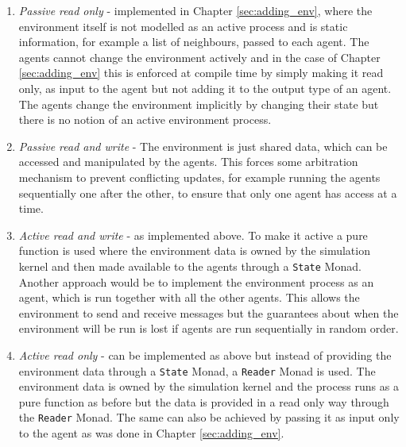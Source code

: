 \begin{enumerate}
	\item \textit{Passive read only} - implemented in Chapter \ref{sec:adding_env}, where the environment itself is not modelled as an active process and is static information, for example a list of neighbours, passed to each agent. The agents cannot change the environment actively and in the case of Chapter \ref{sec:adding_env} this is enforced at compile time by simply making it read only, as input to the agent but not adding it to the output type of an agent. The agents change the environment implicitly by changing their state but there is no notion of an active environment process.
	
	\item \textit{Passive read and write} - The environment is just shared data, which can be accessed and manipulated by the agents. This forces some arbitration mechanism to prevent conflicting updates, for example running the agents sequentially one after the other, to ensure that only one agent has access at a time.
	
	\item \textit{Active read and write} - as implemented above. To make it active a pure function is used where the environment data is owned by the simulation kernel and then made available to the agents through a \texttt{State} Monad. Another approach would be to implement the environment process as an agent, which is run together with all the other agents. This allows the environment to send and receive messages but the guarantees about when the environment will be run is lost if agents are run sequentially in random order.
	
	\item \textit{Active read only} - can be implemented as above but instead of providing the environment data through a \texttt{State} Monad, a \texttt{Reader} Monad is used. The environment data is owned by the simulation kernel and the process runs as a pure function as before but the data is provided in a read only way through the \texttt{Reader} Monad. The same can also be achieved by passing it as input only to the agent as was done in Chapter \ref{sec:adding_env}.
\end{enumerate}